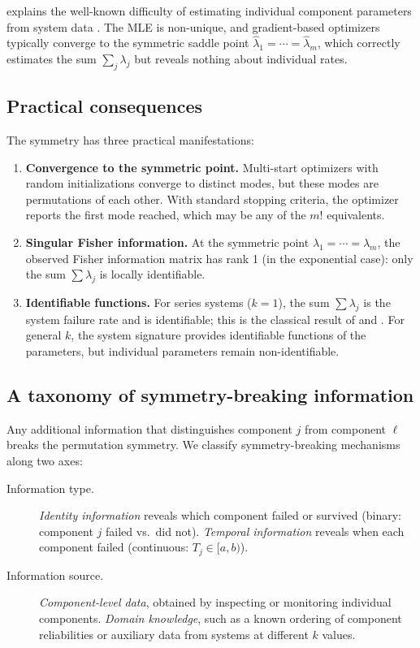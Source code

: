 \documentclass[12pt]{article}
\begin{document}
 explains the well-known difficulty of estimating individual
component parameters from system data \citep{Nowik1990}.  The MLE is
non-unique, and gradient-based optimizers typically converge to the symmetric
saddle point $\hat\lambda_1 = \cdots = \hat\lambda_m$, which correctly
estimates the sum $\sum_j \lambda_j$ but reveals nothing about individual
rates.

\subsection{Practical consequences}\label{sec:consequences}

The symmetry has three practical manifestations:
\begin{enumerate}
  \item \textbf{Convergence to the symmetric point.}  Multi-start
    optimizers with random initializations converge to distinct modes, but
    these modes are permutations of each other.  With standard stopping
    criteria, the optimizer reports the first mode reached, which may be any
    of the $m!$ equivalents.

  \item \textbf{Singular Fisher information.}  At the symmetric point
    $\lambda_1 = \cdots = \lambda_m$, the observed Fisher information matrix
    has rank 1 (in the exponential case): only the sum $\sum \lambda_j$
    is locally identifiable.

  \item \textbf{Identifiable functions.}  For series systems ($k = 1$),
    the sum $\sum \lambda_j$ is the system failure rate and is identifiable;
    this is the classical result of \citet{Cox1959} and \citet{Tsiatis1975}.
    For general $k$, the system signature provides identifiable functions
    of the parameters, but individual parameters remain non-identifiable.
\end{enumerate}

\subsection{A taxonomy of symmetry-breaking information}
\label{sec:taxonomy}

Any additional information that distinguishes component $j$ from component
$\ell$ breaks the permutation symmetry.  We classify symmetry-breaking
mechanisms along two axes:
\begin{description}
  \item[Information type.]
    \emph{Identity information} reveals which component failed or survived
    (binary: component $j$ failed vs.\ did not).
    \emph{Temporal information} reveals when each component failed (continuous:
    $T_j \in [a, b)$).

  \item[Information source.]
    \emph{Component-level data}, obtained by inspecting or monitoring
    individual components.
    \emph{Domain knowledge}, such as a known ordering of component
    reliabilities or auxiliary data from systems at different $k$ values.
\end{description}
\end{document}
